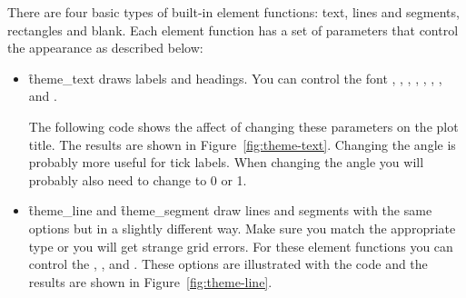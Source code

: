 There are four basic types of built-in element functions: text, lines and segments, rectangles and blank.  Each element function has a set of parameters that control the appearance as described below:

\begin{itemize}
  \item \f{theme_text} draws labels and headings. You can control the font , , , , , , , and .
  
  The following code shows the affect of changing these parameters on the plot title. The results are shown in Figure~\ref{fig:theme-text}. Changing the angle is probably more useful for tick labels.  When changing the angle you will probably also need to change  to 0 or 1.
  
    

  \item \f{theme_line} and \f{theme_segment} draw lines and segments with the same options but in a slightly different way.  Make sure you match the appropriate type or you will get strange grid errors.  For these element functions you can control the , , and .  These options are illustrated with the code and the results are shown in Figure~\ref{fig:theme-line}.

    


\end{itemize}

